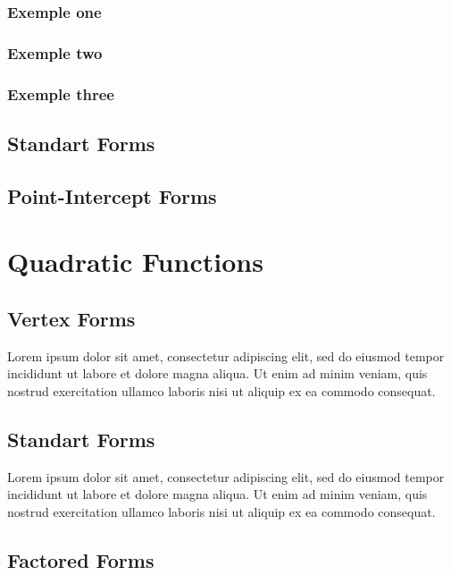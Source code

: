 \documentclass[12pt, a4paper]{article}
\newcommand\shortlorem{Lorem ipsum dolor sit amet, consectetur adipiscing elit, sed do eiusmod tempor incididunt ut labore et dolore magna aliqua. Ut enim ad minim veniam, quis nostrud exercitation ullamco laboris nisi ut aliquip ex ea commodo consequat.}
\begin{document}
                \subsubsection{Exemple one}
                \subsubsection{Exemple two}
                \subsubsection{Exemple three}
        \subsection{Standart Forms}
        \subsection{Point-Intercept Forms}
\section{Quadratic Functions}
        \subsection{Vertex Forms}
        \shortlorem
        \subsection{Standart Forms}
        \shortlorem
        \subsection{Factored Forms}
\end{document}
